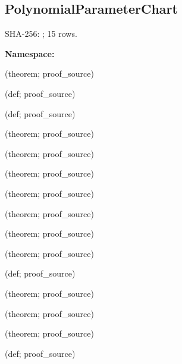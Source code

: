 \subsection*{PolynomialParameterChart}
{\footnotesize SHA-256: ; 15 rows.}\par
\begingroup\small
\textbf{Namespace:} \par
\noindent{} {\scriptsize (theorem; proof\_source)}\par
\noindent{} {\scriptsize (def; proof\_source)}\par
\noindent{} {\scriptsize (def; proof\_source)}\par
\noindent{} {\scriptsize (theorem; proof\_source)}\par
\noindent{} {\scriptsize (theorem; proof\_source)}\par
\noindent{} {\scriptsize (theorem; proof\_source)}\par
\noindent{} {\scriptsize (theorem; proof\_source)}\par
\noindent{} {\scriptsize (theorem; proof\_source)}\par
\noindent{} {\scriptsize (theorem; proof\_source)}\par
\noindent{} {\scriptsize (theorem; proof\_source)}\par
\noindent{} {\scriptsize (def; proof\_source)}\par
\noindent{} {\scriptsize (theorem; proof\_source)}\par
\noindent{} {\scriptsize (theorem; proof\_source)}\par
\noindent{} {\scriptsize (theorem; proof\_source)}\par
\noindent{} {\scriptsize (def; proof\_source)}\par
\endgroup
